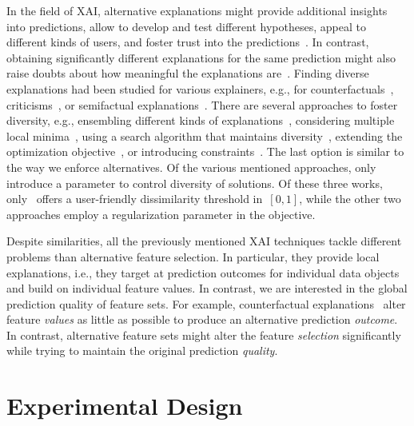 \documentclass{article}
\theoremstyle{definition}
\begin{document}
In the field of XAI, alternative explanations might provide additional insights into predictions, allow to develop and test different hypotheses, appeal to different kinds of users, and foster trust into the predictions~\cite{kim2021multi, wang2019designing}.
In contrast, obtaining significantly different explanations for the same prediction might also raise doubts about how meaningful the explanations are~\cite{jain2019attention}.
Finding diverse explanations had been studied for various explainers, e.g., for counterfactuals~\cite{dandl2020multi, karimi2020model, mohammadi2021scaling, mothilal2020explaining, russell2019efficient, wachter2017counterfactual}, criticisms~\cite{kim2016examples}, or semifactual explanations~\cite{artelt2022even}.
There are several approaches to foster diversity, e.g., ensembling different kinds of explanations~\cite{silva2019produce}, considering multiple local minima~\cite{wachter2017counterfactual}, using a search algorithm that maintains diversity~\cite{dandl2020multi}, extending the optimization objective~\cite{artelt2022even, kim2016examples, mothilal2020explaining}, or introducing constraints~\cite{karimi2020model, mohammadi2021scaling, russell2019efficient}.
The last option is similar to the way we enforce alternatives.
Of the various mentioned approaches, only~\cite{artelt2022even, mohammadi2021scaling, mothilal2020explaining} introduce a parameter to control diversity of solutions.
Of these three works, only~\cite{mohammadi2021scaling} offers a user-friendly dissimilarity threshold in~$[0,1]$, while the other two approaches employ a regularization parameter in the objective.

Despite similarities, all the previously mentioned XAI techniques tackle different problems than alternative feature selection.
In particular, they provide local explanations, i.e., they target at prediction outcomes for individual data objects and build on individual feature values.
In contrast, we are interested in the global prediction quality of feature sets.
For example, counterfactual explanations~\cite{guidotti2022counterfactual, stepin2021survey, verma2020counterfactual} alter feature \emph{values} as little as possible to produce an alternative prediction \emph{outcome}.
In contrast, alternative feature sets might alter the feature \emph{selection} significantly while trying to maintain the original prediction \emph{quality}.

\section{Experimental Design}
\label{sec:afs:experimental-design}
\end{document}

